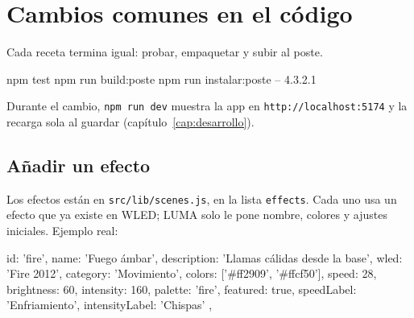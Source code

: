 \chapter{Cambios comunes en el código}\label{cap:cambios}

Cada receta termina igual: probar, empaquetar y subir al poste.

\begin{comando}
npm test
npm run build:poste
npm run instalar:poste -- 4.3.2.1
\end{comando}

Durante el cambio, \texttt{npm run dev} muestra la app en \texttt{http://localhost:5174} y la recarga sola al guardar (capítulo~\ref{cap:desarrollo}).

\section{Añadir un efecto}

Los efectos están en \texttt{src/lib/scenes.js}, en la lista \texttt{effects}. Cada uno usa un efecto que ya existe en WLED; LUMA solo le pone nombre, colores y ajustes iniciales. Ejemplo real:

\begin{codigo}
{ id: 'fire', name: 'Fuego ámbar', description: 'Llamas cálidas desde la base',
  wled: 'Fire 2012', category: 'Movimiento', colors: ['#ff2909', '#ffcf50'],
  speed: 28, brightness: 60, intensity: 160, palette: 'fire', featured: true,
  speedLabel: 'Enfriamiento', intensityLabel: 'Chispas' },
\end{codigo}

